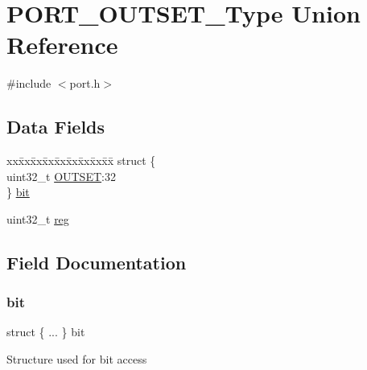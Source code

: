\hypertarget{union_p_o_r_t___o_u_t_s_e_t___type}{}\section{P\+O\+R\+T\+\_\+\+O\+U\+T\+S\+E\+T\+\_\+\+Type Union Reference}
\label{union_p_o_r_t___o_u_t_s_e_t___type}


{\ttfamily \#include $<$port.\+h$>$}

\subsection*{Data Fields}
\begin{DoxyCompactItemize}
\item 
\begin{tabbing}
xx\=xx\=xx\=xx\=xx\=xx\=xx\=xx\=xx\=\kill
struct \{\\
\>uint32\_t \mbox{\hyperlink{union_p_o_r_t___o_u_t_s_e_t___type_a8bd0915f4b42b6c1833e368d8ac11766}{OUTSET}}:32\\
\} \mbox{\hyperlink{union_p_o_r_t___o_u_t_s_e_t___type_af9b95acb91d27c9e8104489aa6e48479}{bit}}\\

\end{tabbing}\item 
uint32\+\_\+t \mbox{\hyperlink{union_p_o_r_t___o_u_t_s_e_t___type_a6b91636401516a477989a336376d7b40}{reg}}
\end{DoxyCompactItemize}


\subsection{Field Documentation}
\mbox{\label{union_p_o_r_t___o_u_t_s_e_t___type_af9b95acb91d27c9e8104489aa6e48479}} 
\subsubsection{\texorpdfstring{bit}{bit}}
{\footnotesize\ttfamily struct \{ ... \}   bit}

Structure used for bit access \mbox{\label{union_p_o_r_t___o_u_t_s_e_t___type_a8bd0915f4b42b6c1833e368d8ac11766}} 
